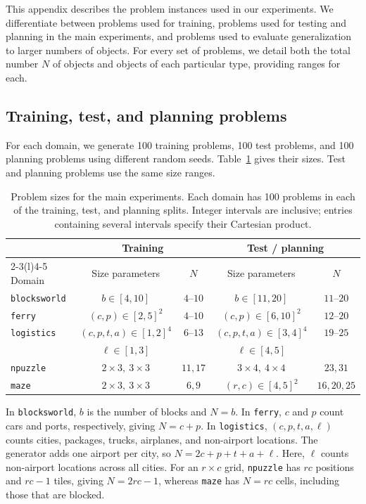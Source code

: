 This appendix describes the problem instances used in our experiments. We differentiate between problems used for training, problems used for testing and planning in the main experiments, and problems used to evaluate generalization to larger numbers of objects. For every set of problems, we detail both the total number $N$ of objects and objects of each particular type, providing ranges for each.

\subsection{Training, test, and planning problems}
\label{app:problem-instances}

For each domain, we generate 100 training problems, 100 test problems, and 100
planning problems using different random seeds. Table~\ref{tab:problem-sizes} gives their sizes. Test and
planning problems use the same size ranges.

\begin{table}[ht]
\centering
\caption{Problem sizes for the main experiments. Each domain has 100 problems
in each of the training, test, and planning splits. Integer intervals are
inclusive; entries containing several intervals specify their Cartesian product.}
\label{tab:problem-sizes}
\small
\setlength{\tabcolsep}{4pt}
\begin{tabular}{@{}lcccc@{}}
\toprule
& \multicolumn{2}{c}{Training} & \multicolumn{2}{c}{Test / planning} \\
\cmidrule(lr){2-3}\cmidrule(l){4-5}
Domain & Size parameters & $N$ & Size parameters & $N$ \\
\midrule
\texttt{blocksworld} & $b\in[4,10]$ & $4$--$10$ & $b\in[11,20]$ & $11$--$20$ \\
\texttt{ferry} & $(c,p)\in[2,5]^2$ & $4$--$10$ & $(c,p)\in[6,10]^2$ & $12$--$20$ \\
\texttt{logistics} & $(c,p,t,a)\in[1,2]^4$ & $6$--$13$ & $(c,p,t,a)\in[3,4]^4$ & $19$--$25$ \\
& $\ell\in[1,3]$ & & $\ell\in[4,5]$ & \\
\texttt{npuzzle} & $2\!\times\!3,\ 3\!\times\!3$ & $11,17$ & $3\!\times\!4,\ 4\!\times\!4$ & $23,31$ \\
\texttt{maze} & $2\!\times\!3,\ 3\!\times\!3$ & $6,9$ & $(r,c)\in[4,5]^2$ & $16,20,25$ \\
\bottomrule
\end{tabular}
\end{table}

In \texttt{blocksworld}, $b$ is the number of blocks and $N=b$. 
In \texttt{ferry}, $c$ and $p$ count cars and ports,
respectively, giving $N=c+p$.
In \texttt{logistics}, $(c,p,t,a,\ell)$ counts
cities, packages, trucks, airplanes, and non-airport locations. The generator
adds one airport per city, so $N=2c+p+t+a+\ell$. Here, $\ell$ counts non-airport
locations across all cities. For an $r\times c$ grid, \texttt{npuzzle} has $rc$
positions and $rc-1$ tiles, giving $N=2rc-1$, whereas \texttt{maze} has $N=rc$
cells, including those that are blocked.

